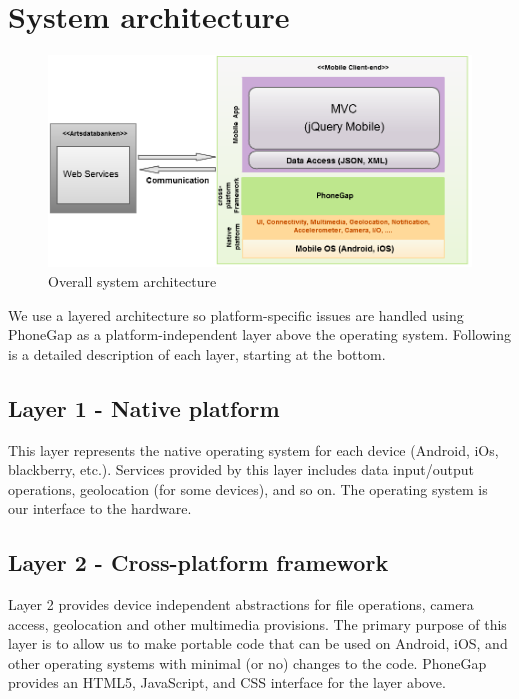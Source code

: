 \section{System architecture}
\begin{figure}[htb]
	\centering
	\includegraphics[width=1.0\textwidth]{architecture/architecture.png}
	\caption{Overall system architecture}
	\label{fig:architecture}
\end{figure}

We use a layered architecture so platform-specific issues are handled using
PhoneGap as a platform-independent layer above the operating system. Following
is a detailed description of each layer, starting at the bottom.

\subsection{Layer 1 - Native platform}

This layer represents the native operating system for each device (Android, iOs,
blackberry, etc.). Services provided by this layer includes data input/output
operations, geolocation (for some devices), and so on. The operating system is
our interface to the hardware.

\subsection{Layer 2 - Cross-platform framework}

Layer 2 provides device independent abstractions for file operations, camera
access, geolocation and other multimedia provisions. The primary purpose of this layer is to allow us to
make portable code that can be used on Android, iOS, and other operating systems
with minimal (or no) changes to the code. PhoneGap provides an HTML5,
JavaScript, and CSS interface for the layer above.

